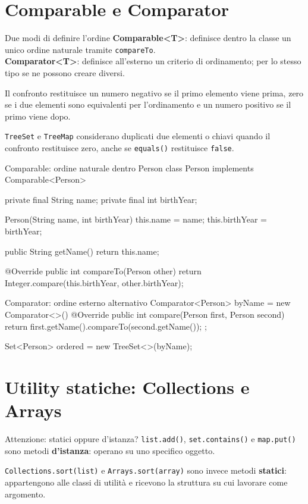 ﻿\documentclass[10pt,a4paper]{article}
\newcommand{\cmd}[1]{\texttt{#1}}
\newcommand{\topicsection}[1]{\Needspace{12\baselineskip}\section{#1}}
\newenvironment{topicblock}{%
  \par\medskip\noindent\begin{minipage}{\textwidth}%
}{%
  \end{minipage}\par\medskip%
}
\begin{document}
\begin{topicblock}
\topicsection{Comparable e Comparator}

\begin{concept}{Due modi di definire l'ordine}
\textbf{Comparable<T>}: definisce dentro la classe un unico ordine naturale
tramite \cmd{compareTo}.\\
\textbf{Comparator<T>}: definisce all'esterno un criterio di ordinamento;
per lo stesso tipo se ne possono creare diversi.

Il confronto restituisce un numero negativo se il primo elemento viene prima,
zero se i due elementi sono equivalenti per l'ordinamento e un numero positivo
se il primo viene dopo.

\cmd{TreeSet} e \cmd{TreeMap} considerano duplicati due elementi o chiavi
quando il confronto restituisce zero, anche se \cmd{equals()} restituisce
\cmd{false}.
\end{concept}

\begin{codebox}{Comparable: ordine naturale dentro Person}
class Person implements Comparable<Person> {
    private final String name;
    private final int birthYear;

    Person(String name, int birthYear) {
        this.name = name;
        this.birthYear = birthYear;
    }

    public String getName() {
        return this.name;
    }

    @Override
    public int compareTo(Person other) {
        return Integer.compare(this.birthYear, other.birthYear);
    }
}
\end{codebox}

\begin{codebox}{Comparator: ordine esterno alternativo}
Comparator<Person> byName = new Comparator<>() {
    @Override
    public int compare(Person first, Person second) {
        return first.getName().compareTo(second.getName());
    }
};

Set<Person> ordered = new TreeSet<>(byName);
\end{codebox}

\end{topicblock}
\topicsection{Utility statiche: Collections e Arrays}

\begin{concept}{Attenzione: statici oppure d'istanza?}
\cmd{list.add()}, \cmd{set.contains()} e \cmd{map.put()} sono metodi
\textbf{d'istanza}: operano su uno specifico oggetto.

\cmd{Collections.sort(list)} e \cmd{Arrays.sort(array)} sono invece metodi
\textbf{statici}: appartengono alle classi di utilità e ricevono la struttura
su cui lavorare come argomento.
\end{concept}
\end{document}
